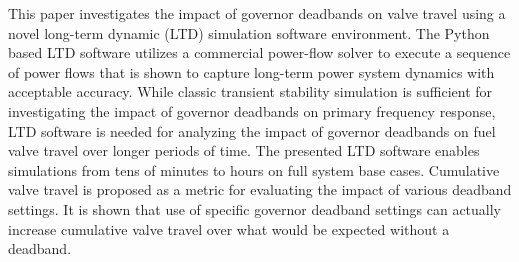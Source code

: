 %
This paper investigates the impact of governor deadbands on valve travel using a novel long-term dynamic (LTD) simulation software environment. 
The Python based LTD software utilizes a commercial power-flow solver to execute a sequence of power flows that is shown to capture long-term power system dynamics with acceptable accuracy.
While classic transient stability simulation is sufficient for investigating the impact of governor deadbands on primary frequency response, LTD software is needed for analyzing the impact of governor deadbands on fuel valve travel over longer periods of time. 
The presented LTD software enables simulations from tens of minutes to hours on full system base cases. %
Cumulative valve travel is proposed as a metric for evaluating the impact of various deadband settings.
It is shown that use of specific governor deadband settings can actually increase cumulative valve travel over what would be expected without a deadband.